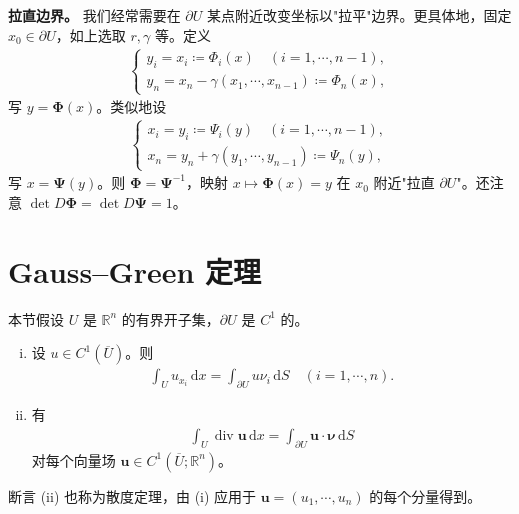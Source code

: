 \documentclass[../main.tex]{subfiles}
\begin{document}
\textbf{拉直边界。} 我们经常需要在 $\partial U$ 某点附近改变坐标以"拉平"边界。更具体地，固定 $x_0\in\partial U$，如上选取 $r,\gamma$ 等。定义
\begin{align*}
\begin{cases}
y_i=x_i\coloneqq\Phi_i(x)\quad (i=1,\cdots,n-1),\\
y_n=x_n-\gamma(x_1,\cdots,x_{n-1})\coloneqq\Phi_n(x),
\end{cases}
\end{align*}
写 $y=\boldsymbol{\Phi}(x)$。类似地设
\begin{align*}
\begin{cases}
x_i=y_i\coloneqq\Psi_i(y)\quad (i=1,\cdots,n-1),\\
x_n=y_n+\gamma(y_1,\cdots,y_{n-1})\coloneqq\Psi_n(y),
\end{cases}
\end{align*}
写 $x=\boldsymbol{\Psi}(y)$。则 $\boldsymbol{\Phi}=\boldsymbol{\Psi}^{-1}$，映射 $x\mapsto\boldsymbol{\Phi}(x)=y$ 在 $x_0$ 附近"拉直 $\partial U$"。还注意 $\det D\boldsymbol{\Phi}=\det D\boldsymbol{\Psi}=1$。

\section{Gauss--Green 定理}\label{section:appC-GaussGreen}

本节假设 $U$ 是 $\mathbb{R}^n$ 的有界开子集，$\partial U$ 是 $C^1$ 的。

\begin{theorem}\label{theorem:appC-GaussGreen}
\begin{enumerate}[(i)]
\item 设 $u\in C^1(\overline{U})$。则
\begin{align}
\int_U u_{x_i}\,\mathrm{d}x=\int_{\partial U}u\nu_i\,\mathrm{d}S \quad (i=1,\cdots,n).
\label{align:appC-GG1}
\end{align}
\item 有
\begin{align}
\int_U\operatorname{div}\mathbf{u}\,\mathrm{d}x=\int_{\partial U}\mathbf{u}\cdot\boldsymbol{\nu}\,\mathrm{d}S
\label{align:appC-GG2}
\end{align}
对每个向量场 $\mathbf{u}\in C^1(\overline{U};\mathbb{R}^n)$。
\end{enumerate}
\end{theorem}

断言 (ii) 也称为散度定理，由 (i) 应用于 $\mathbf{u}=(u_1,\cdots,u_n)$ 的每个分量得到。
\end{document}
